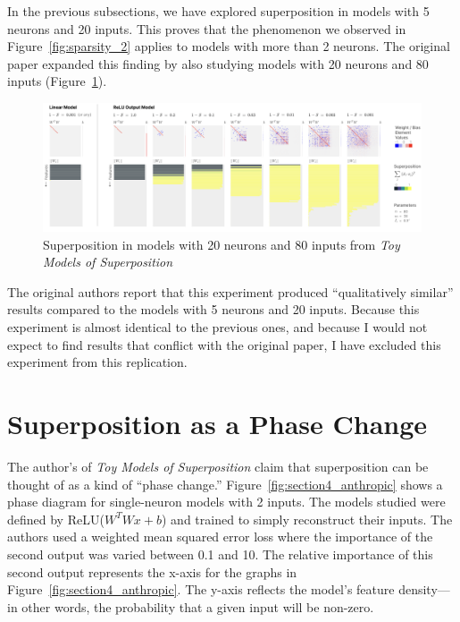 \documentclass{article} %
\begin{document}
In the previous subsections, we have explored superposition in models with 5
neurons and 20 inputs. This proves that the phenomenon we observed in Figure~\ref{fig:sparsity_2}
applies to models with more than 2 neurons. The original paper expanded this 
finding by also studying models with 20 neurons and 80 inputs (Figure~\ref{fig:section3_anthropic2}). \\

\begin{figure}[h]
    \centering
    \includegraphics[width=0.99\linewidth]{demonstrating_superposition/images/anthropic_section3_part2.png}
    \captionsetup{font=footnotesize, width=0.7\linewidth} %
    \caption{
        Superposition in models with 20 neurons and 80 inputs from \textit{Toy Models of Superposition}\cite{elhage2022toy}
    }
    \label{fig:section3_anthropic2}
\end{figure}

The original authors report that this experiment produced ``qualitatively similar''
results compared to the models with 5 neurons and 20 inputs. Because this experiment 
is almost identical to the previous ones, and because I would not expect to find 
results that conflict with the original paper, I have excluded this experiment 
from this replication. \\

\section{Superposition as a Phase Change}

The author's of \textit{Toy Models of Superposition} claim that superposition
can be thought of as a kind of ``phase change.'' Figure~\ref{fig:section4_anthropic}
shows a phase diagram for single-neuron models with 2 inputs. The models studied were
defined by ReLU($W^TWx + b$) and trained to simply reconstruct their inputs. The authors 
used a weighted mean squared error loss where the importance of 
the second output was varied between 0.1 and 10. The relative importance of this
second output represents the x-axis for the graphs in Figure~\ref{fig:section4_anthropic}.
The y-axis reflects the model's feature density---in other words, the probability
that a given input will be non-zero.
\end{document}
